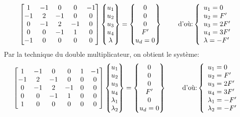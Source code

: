 \begin{equation}
\MM*{1& -1 & 0 & 0 & -1 \\ -1 & 2 & -1 & 0 & 0 \\ 0 & -1 & 2 & -1 & 0\\ 0&0&-1&1& 0 \\ -1&0&0&0&0}
\VV*{u_1\\u_2\\u_3\\u_4\\ \lambda}
=
\VV*{0\\0\\0\\F' \\ u_d=0}
\qquad \text{ d'où:} 
\left\{\begin{array}{l} u_1=0 \\ u_2=F' \\ u_3=2F' \\ u_4=3F' \\ \lambda = -F' \end{array}\right.
\end{equation}
\medskipvm
Par la technique du double multiplicateur, on obtient le système:
\begin{equation}
\MM*{1 & -1 & 0 & 0 & 1&-1 \\ -1 & 2 & -1 & 0 & 0&0 \\ 0 & -1 & 2 & -1 & 0&0\\ 0&0&-1&1& 0&0 \\ 1&0&0&0&0&0}
\VV*{u_1\\u_2\\u_3\\u_4\\ \lambda_1 \\ \lambda_2}
=
\VV*{0\\0\\0\\F' \\ 0 \\ u_d=0}
\qquad \text{ d'où:} 
\left\{\begin{array}{l} u_1=0 \\ u_2=F' \\ u_3=2F' \\ u_4=3F' \\ \lambda_1 = -F' \\ \lambda_2 = -F' \end{array}\right.
\end{equation}
